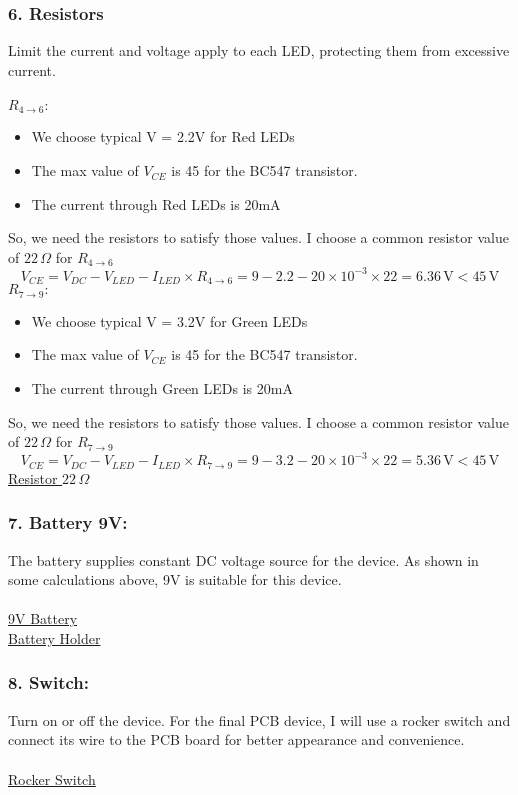 \documentclass[a4paper]{article}
\numberwithin{figure}{section}
\begin{document}
\subsubsection*{6. Resistors }
Limit the current and voltage apply to each LED, protecting them from excessive current.\\
\\
{\boldmath$R_{4\rightarrow6}:$}
\begin{itemize}
    \item We choose typical V = 2.2V for Red LEDs
    \item The max value of $V_{CE}$ is 45 for the BC547 transistor.
    \item The current through Red LEDs is 20mA
\end{itemize}
So, we need the resistors to satisfy those values. I choose a common resistor value of $22 \, \Omega$ for $R_{4\rightarrow6}$
$$
V_{CE}=V_{DC} - V_{LED} -I_{LED}\times R_{4\rightarrow6} = 9-2.2-20\times10^{-3}\times22=6.36 \, \mathrm{V} < 45 \, \mathrm{V}
$$
{\boldmath$R_{7\rightarrow9}:$}
\begin{itemize}
    \item We choose typical V = 3.2V for Green LEDs
    \item The max value of $V_{CE}$ is 45 for the BC547 transistor.
    \item The current through Green LEDs is 20mA
\end{itemize}
So, we need the resistors to satisfy those values. I choose a common resistor value of $22 \, \Omega$ for $R_{7\rightarrow9}$
$$
V_{CE}=V_{DC} - V_{LED} -I_{LED}\times R_{7\rightarrow9} = 9-3.2-20\times10^{-3}\times22=5.36 \, \mathrm{V} < 45 \, \mathrm{V}
$$
\href{https://banlinhkien.com/tro-carbon-film-14w-22r-5-cf14w22rjtb-chinh-hang-maxquality-tui-500-chiec-p38420308.html}{Resistor $22 \, \Omega$}
\subsubsection*{7. Battery 9V:} 
The battery supplies constant DC voltage source for the device. As shown in some calculations above, 9V is suitable for this device.\\
\\
\href{https://caka.vn/pin-9v}{9V Battery}\\
\href{https://dientunhattung.com/san-pham/de-pin-9v-han-pcb-hop-de-pin-9v-han-mach-khong-nap/}{Battery Holder}

\subsubsection*{8. Switch:}
Turn on or off the device. For the final PCB device, I will use a rocker switch and connect its wire to the PCB board for better appearance and convenience.\\
\\
\href{https://www.thegioiic.com/kcd1-101-cong-tac-bap-benh-on-off-2-chan-noi-day-dai-10cm}{Rocker Switch}
\newpage
\end{document}
